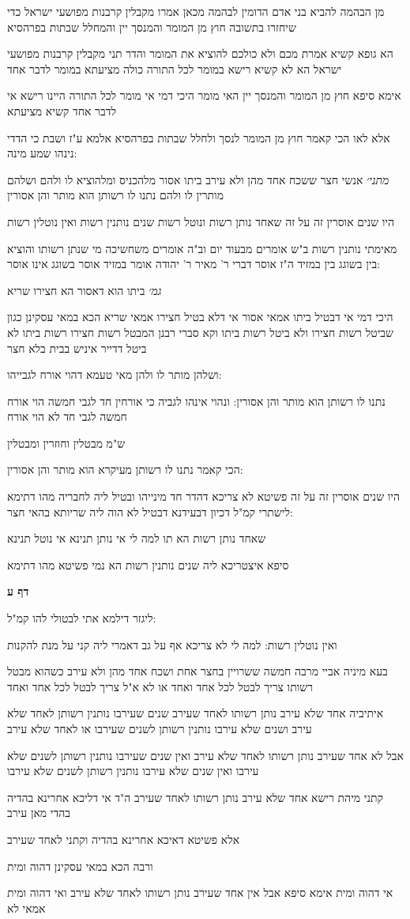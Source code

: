 \documentclass[12pt, openany]{book}
\newcommand{\sethebfont}{
\fontsize{10.5pt}{21.0pt} \selectfont
}
\newcommand{\textblock}[1]{
{\sethebfont #1\\}	
}
\newcommand{\sectname}{}
\newcommand{\newsection}[1]{
	\addcontentsline{toc}{section}{#1}
	\renewcommand{\sectname}{#1}	
	\vspace{-\baselineskip}
	\begin{center}
		\textbf{%
\fontsize{16pt}{16pt}\selectfont
			#1}
	\end{center}
	\vspace{-\baselineskip}
	\nopagebreak
}
\begin{document}
\textblock{מן הבהמה להביא בני אדם הדומין לבהמה מכאן אמרו מקבלין קרבנות מפושעי ישראל כדי שיחזרו בתשובה חוץ מן המומר והמנסך יין והמחלל שבתות בפרהסיא}
\textblock{הא גופא קשיא אמרת מכם ולא כולכם להוציא את המומר והדר תני מקבלין קרבנות מפושעי ישראל הא לא קשיא רישא במומר לכל התורה כולה מציעתא במומר לדבר אחד}
\textblock{אימא סיפא חוץ מן המומר והמנסך יין האי מומר היכי דמי אי מומר לכל התורה היינו רישא אי לדבר אחד קשיא מציעתא}
\textblock{אלא לאו הכי קאמר חוץ מן המומר לנסך ולחלל שבתות בפרהסיא אלמא ע"ז ושבת כי הדדי נינהו שמע מינה:}
\textblock{{\large\emph{מתני׳}} אנשי חצר ששכח אחד מהן ולא עירב ביתו אסור מלהכניס ומלהוציא לו ולהם ושלהם מותרין לו ולהם נתנו לו רשותן הוא מותר והן אסורין}
\textblock{היו שנים אוסרין זה על זה שאחד נותן רשות ונוטל רשות שנים נותנין רשות ואין נוטלין רשות}
\textblock{מאימתי נותנין רשות ב"ש אומרים מבעוד יום וב"ה אומרים משחשיכה מי שנתן רשותו והוציא בין בשוגג בין במזיד ה"ז אוסר דברי ר' מאיר ר' יהודה אומר במזיד אוסר בשוגג אינו אוסר:}
\textblock{{\large\emph{גמ׳}} ביתו הוא דאסור הא חצירו שריא}
\textblock{היכי דמי אי דבטיל ביתו אמאי אסור אי דלא בטיל חצירו אמאי שריא הכא במאי עסקינן כגון שביטל רשות חצירו ולא ביטל רשות ביתו וקא סברי רבנן המבטל רשות חצירו רשות ביתו לא ביטל דדייר איניש בבית בלא חצר}
\textblock{ושלהן מותר לו ולהן מאי טעמא דהוי אורח לגבייהו:}
\textblock{נתנו לו רשותן הוא מותר והן אסורין: ונהוי אינהו לגביה כי אורחין חד לגבי חמשה הוי אורח חמשה לגבי חד לא הוי אורח}
\textblock{ש"מ מבטלין וחוזרין ומבטלין}
\textblock{הכי קאמר נתנו לו רשותן מעיקרא הוא מותר והן אסורין:}
\textblock{היו שנים אוסרין זה על זה פשיטא לא צריכא דהדר חד מינייהו ובטיל ליה לחבריה מהו דתימא לישתרי קמ"ל דכיון דבעידנא דבטיל לא הוה ליה שריותא בהאי חצר:}
\textblock{שאחד נותן רשות הא תו למה לי אי נותן תנינא אי נוטל תנינא}
\textblock{סיפא איצטריכא ליה שנים נותנין רשות הא נמי פשיטא מהו דתימא}
\newsection{דף ע}
\textblock{ליגזר דילמא אתי לבטולי להו קמ"ל:}
\textblock{ואין נוטלין רשות: למה לי לא צריכא אף על גב דאמרי ליה קני על מנת להקנות}
\textblock{בעא מיניה אביי מרבה חמשה ששרויין בחצר אחת ושכח אחד מהן ולא עירב כשהוא מבטל רשותו צריך לבטל לכל אחד ואחד או לא א"ל צריך לבטל לכל אחד ואחד}
\textblock{איתיביה אחד שלא עירב נותן רשותו לאחד שעירב שנים שעירבו נותנין רשותן לאחד שלא עירב ושנים שלא עירבו נותנין רשותן לשנים שעירבו או לאחד שלא עירב}
\textblock{אבל לא אחד שעירב נותן רשותו לאחד שלא עירב ואין שנים שעירבו נותנין רשותן לשנים שלא עירבו ואין שנים שלא עירבו נותנין רשותן לשנים שלא עירבו}
\textblock{קתני מיהת רישא אחד שלא עירב נותן רשותו לאחד שעירב ה"ד אי דליכא אחרינא בהדיה בהדי מאן עירב}
\textblock{אלא פשיטא דאיכא אחרינא בהדיה וקתני לאחד שעירב}
\textblock{ורבה הכא במאי עסקינן דהוה ומית}
\textblock{אי דהוה ומית אימא סיפא אבל אין אחד שעירב נותן רשותו לאחד שלא עירב ואי דהוה ומית אמאי לא}
\end{document}
